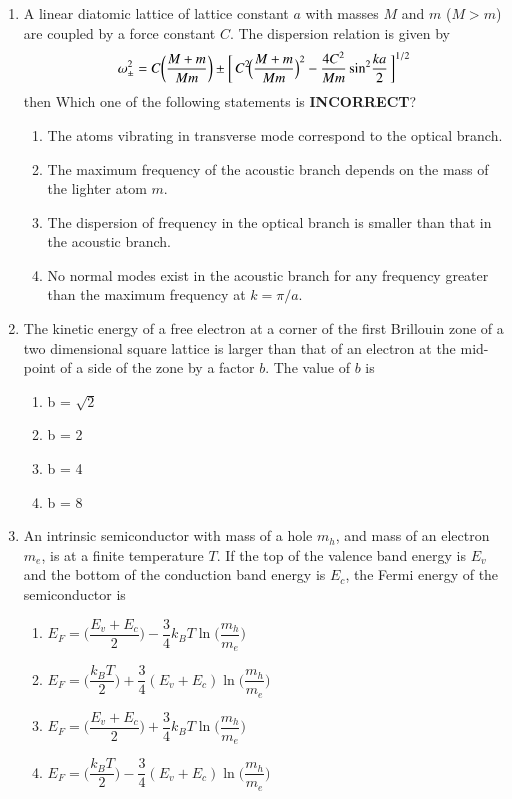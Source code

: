 \documentclass[journal,12pt,onecolumn]{IEEEtran}
\theoremstyle{remark}
\begin{document}
\begin{enumerate}
\item A linear diatomic lattice of lattice constant $a$ with masses $M$ and $m$ ($M>m$) are coupled by a force constant $C$. The dispersion relation is given by
\begin{align*}
\omega_{\pm}^2 = C\biggl(\frac{M+m}{Mm}\biggr) \pm \biggl[\,C^2\!\Bigl(\frac{M+m}{Mm}\Bigr)^2 - \frac{4C^2}{Mm}\sin^2\!\frac{ka}{2}\,\biggr]^{1/2}
\end{align*}
then Which one of the following statements is \textbf{INCORRECT}?
\hfill{}
\begin{enumerate}
    \item The atoms vibrating in transverse mode correspond to the optical branch.
    \item The maximum frequency of the acoustic branch depends on the mass of the lighter atom $m$.
    \item The dispersion of frequency in the optical branch is smaller than that in the acoustic branch.
    \item No normal modes exist in the acoustic branch for any frequency greater than the maximum frequency at $k=\pi/a$.
\end{enumerate}

\item The kinetic energy of a free electron at a corner of the first Brillouin zone of a two dimensional square lattice is larger than that of an electron at the mid-point of a side of the zone by a factor $b$. The value of $b$ is
\hfill{}
\begin{multicols}{4}
\begin{enumerate}
    \item b = $\sqrt{2}$
    \item b = 2
    \item b = 4
    \item b = 8
\end{enumerate}
\end{multicols}

\item An intrinsic semiconductor with mass of a hole $m_h$, and mass of an electron $m_e$, is at a finite temperature $T$. If the top of the valence band energy is $E_v$ and the bottom of the conduction band energy is $E_c$, the Fermi energy of the semiconductor is
\hfill{}
\begin{multicols}{2}
\begin{enumerate}
    \item $E_F = \biggl(\dfrac{E_v+E_c}{2}\biggr) - \dfrac{3}{4} k_B T \ln\biggl(\dfrac{m_h}{m_e}\biggr)$
    \item $E_F = \biggl(\dfrac{k_B T}{2}\biggr) + \dfrac{3}{4}(E_v+E_c)\ln\biggl(\dfrac{m_h}{m_e}\biggr)$
    \item $E_F = \biggl(\dfrac{E_v+E_c}{2}\biggr) + \dfrac{3}{4} k_B T \ln\biggl(\dfrac{m_h}{m_e}\biggr)$
    \item $E_F = \biggl(\dfrac{k_B T}{2}\biggr) - \dfrac{3}{4}(E_v+E_c)\ln\biggl(\dfrac{m_h}{m_e}\biggr)$
\end{enumerate}
\end{multicols}


\end{enumerate}
\end{document}
